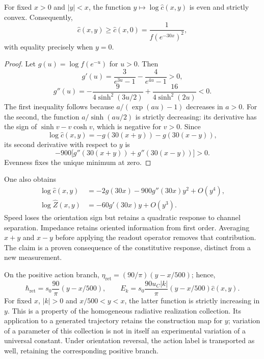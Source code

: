 \begin{proposition}
\label{md:hib:proposicion-convexidad}
For fixed $x>0$ and $|y|<x$, the function
$y\mapsto\log\widehat c(x,y)$ is even and strictly convex.
Consequently,
\begin{equation}
 \widehat c(x,y)\geq\widehat c(x,0)
 =\frac{1}{f(e^{-30x})^2},
 \label{md:hib:cota-velocidad}
\end{equation}
with equality precisely when $y=0$.
\end{proposition}
\begin{proof}
Let $g(u)=\log f(e^{-u})$ for $u>0$. Then
\begin{equation}
 g'(u)=\frac{3}{e^{3u}-1}-\frac{4}{e^{4u}-1}>0,
 \label{md:hib:derivada-g}
\end{equation}
\begin{equation}
 g''(u)=-\frac{9}{4\sinh^2(3u/2)}
 +\frac{16}{4\sinh^2(2u)}<0.
 \label{md:hib:segunda-g}
\end{equation}
The first inequality follows because
$a/(\exp(au)-1)$ decreases in $a>0$. For the second, the function
$a/\sinh(au/2)$ is strictly decreasing: its derivative has the sign of
$\sinh v-v\cosh v$, which is negative for $v>0$. Since
\[
 \log\widehat c(x,y)=-g(30(x+y))-g(30(x-y)),
\]
its second derivative with respect to $y$ is
\begin{equation}
 -900\bigl[g''(30(x+y))+g''(30(x-y))\bigr]>0.
 \label{md:hib:segunda-velocidad}
\end{equation}
Evenness fixes the unique minimum at zero.
\end{proof}
One also obtains
\begin{equation}
 \begin{aligned}
 \log\widehat c(x,y)
 &=-2g(30x)-900g''(30x)y^2+O(y^4),\\
 \log\widehat Z(x,y)
 &=-60g'(30x)y+O(y^3).
 \end{aligned}
 \label{md:hib:desarrollos-canales}
\end{equation}
Speed loses the orientation sign but retains a quadratic response to
channel separation. Impedance retains oriented information from first
order. Averaging $x+y$ and $x-y$ before applying the readout operator
removes that contribution. The claim is a proven consequence of the
constitutive response, distinct from a new measurement.

On the positive action branch,
$\eta_{\mathrm{ret}}=(90/\pi)(y-x/500)$; hence,
\begin{equation}
 \hbar_{\mathrm{ret}}=s_0\frac{90}{\pi}(y-x/500),\qquad
 E_k=s_0\frac{90u_C|k|}{\pi}(y-x/500)\widehat c(x,y).
 \label{md:hib:energia-angular}
\end{equation}
For fixed $x$, $|k|>0$ and $x/500<y<x$, the latter function is strictly
increasing in $y$. This is a property of the homogeneous radiative
realization collection. Its application to a generated trajectory retains the
construction map for $y$; variation of a parameter of this collection is not
in itself an experimental variation of a universal constant.
Under orientation reversal, the action label is transported as well,
retaining the corresponding positive branch.

